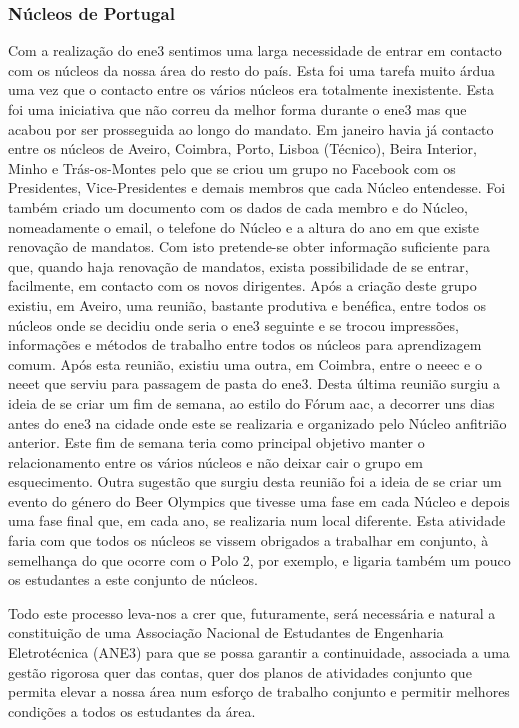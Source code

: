
\subsubsection{Núcleos de Portugal}

Com a realização do \acrshort{ene3} sentimos uma larga necessidade de entrar em contacto com os núcleos da nossa área do resto do país. Esta foi uma tarefa muito árdua uma vez que o contacto entre os vários núcleos era totalmente inexistente. Esta foi uma iniciativa que não correu da melhor forma durante o \acrshort{ene3} mas que acabou por ser prosseguida ao longo do mandato. Em janeiro havia já contacto entre os núcleos de Aveiro, Coimbra, Porto, Lisboa (Técnico), Beira Interior, Minho e Trás-os-Montes pelo que se criou um grupo no Facebook com os Presidentes, Vice-Presidentes e demais membros que cada Núcleo entendesse. Foi também criado um documento com os dados de cada membro e do Núcleo, nomeadamente o email, o telefone do Núcleo e a altura do ano em que existe renovação de mandatos. Com isto pretende-se obter informação suficiente para que, quando haja renovação de mandatos, exista possibilidade de se entrar, facilmente, em contacto com os novos dirigentes. Após a criação deste grupo existiu, em Aveiro, uma reunião, bastante produtiva e benéfica, entre todos os núcleos onde se decidiu onde seria o \acrshort{ene3} seguinte e se trocou impressões, informações e métodos de trabalho entre todos os núcleos para aprendizagem comum. Após esta reunião, existiu uma outra, em Coimbra, entre o \acrshort{neeec} e o \acrfull{neeet} que serviu para passagem de pasta do \acrshort{ene3}. Desta última reunião surgiu a ideia de se criar um fim de semana, ao estilo do Fórum \acrshort{aac}, a decorrer uns dias antes do \acrshort{ene3} na cidade onde este se realizaria e organizado pelo Núcleo anfitrião anterior. Este fim de semana teria como principal objetivo manter o relacionamento entre os vários núcleos e não deixar cair o grupo em esquecimento. Outra sugestão que surgiu desta reunião foi a ideia de se criar um evento do género do Beer Olympics que tivesse uma fase em cada Núcleo e depois uma fase final que, em cada ano, se realizaria num local diferente. Esta atividade faria com que todos os núcleos se vissem obrigados a trabalhar em conjunto, à semelhança do que ocorre com o Polo 2, por exemplo, e ligaria também um pouco os estudantes a este conjunto de núcleos.

Todo este processo leva-nos a crer que, futuramente, será necessária e natural a constituição de uma Associação Nacional de Estudantes de Engenharia Eletrotécnica (ANE3) para que se possa garantir a continuidade, associada a uma gestão rigorosa quer das contas, quer dos planos de atividades conjunto que permita elevar a nossa área num esforço de trabalho conjunto e permitir melhores condições a todos os estudantes da área.